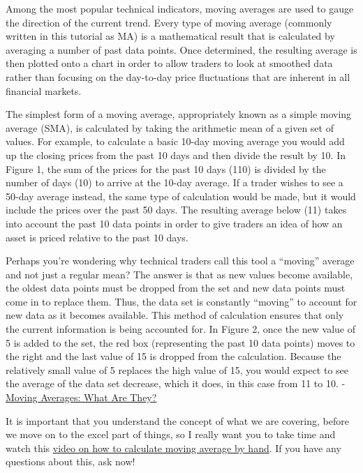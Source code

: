 \documentclass[]{book}
\theoremstyle{definition}
\theoremstyle{definition}
\theoremstyle{definition}
\theoremstyle{remark}
\begin{document}
Among the most popular technical indicators, moving averages are used to
gauge the direction of the current trend. Every type of moving average
(commonly written in this tutorial as MA) is a mathematical result that
is calculated by averaging a number of past data points. Once
determined, the resulting average is then plotted onto a chart in order
to allow traders to look at smoothed data rather than focusing on the
day-to-day price fluctuations that are inherent in all financial
markets.

The simplest form of a moving average, appropriately known as a simple
moving average (SMA), is calculated by taking the arithmetic mean of a
given set of values. For example, to calculate a basic 10-day moving
average you would add up the closing prices from the past 10 days and
then divide the result by 10. In Figure 1, the sum of the prices for the
past 10 days (110) is divided by the number of days (10) to arrive at
the 10-day average. If a trader wishes to see a 50-day average instead,
the same type of calculation would be made, but it would include the
prices over the past 50 days. The resulting average below (11) takes
into account the past 10 data points in order to give traders an idea of
how an asset is priced relative to the past 10 days.

Perhaps you're wondering why technical traders call this tool a
``moving'' average and not just a regular mean? The answer is that as
new values become available, the oldest data points must be dropped from
the set and new data points must come in to replace them. Thus, the data
set is constantly ``moving'' to account for new data as it becomes
available. This method of calculation ensures that only the current
information is being accounted for. In Figure 2, once the new value of 5
is added to the set, the red box (representing the past 10 data points)
moves to the right and the last value of 15 is dropped from the
calculation. Because the relatively small value of 5 replaces the high
value of 15, you would expect to see the average of the data set
decrease, which it does, in this case from 11 to 10. -
\href{http://www.investopedia.com/university/movingaverage/movingaverages1.asp\#ixzz4xbKq8xgI}{Moving
Averages: What Are They?}

It is important that you understand the concept of what we are covering,
before we move on to the excel part of things, so I really want you to
take time and watch this
\href{https://www.youtube.com/watch?v=vvbvVJiJ2fI}{video on how to
calculate moving average by hand}. If you have any questions about this,
ask now!
\end{document}
